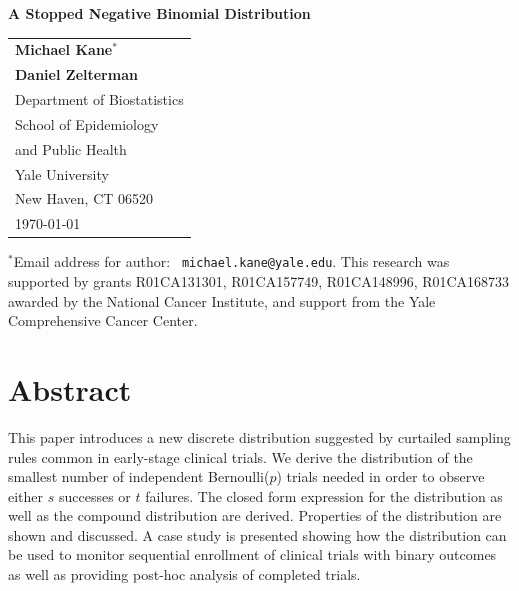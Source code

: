 \documentclass[12pt]{article}         %
\begin{document}
\thispagestyle{empty}
\begin{center}
\vspace*{\fill}

{\Large\bf A Stopped Negative Binomial Distribution} \\ [1ex]

\vspace*{1.25in}
\begin{tabular}{l} 
 {\bf Michael Kane${}^*$} \\
 {\bf Daniel Zelterman}  \\[.1in]

 Department of Biostatistics \\
 School of Epidemiology  \\
 \hspace*{.15in} and Public Health  \\
 Yale University       \\
 New Haven, CT  06520  \\[.2in]

\today
\end{tabular}
\end{center}

\vspace*{\fill}

\noindent${}^*$Email address for author: {\tt
michael.kane@yale.edu}.  This research was supported by grants 
	R01CA131301, R01CA157749, R01CA148996, R01CA168733 awarded by the National Cancer Institute, and support from the Yale Comprehensive Cancer Center.


\newpage
\thispagestyle{empty}

\section*    {\bf   Abstract}

This paper introduces a new discrete distribution suggested by curtailed sampling rules common in early-stage clinical trials. We derive the distribution of the smallest number of independent Bernoulli($p$) trials needed in order to observe either $s$ successes or $t$ failures. The closed form expression for the distribution as well as the compound distribution are derived. Properties of the distribution are shown and discussed. A case study is presented showing how the distribution can be used to monitor sequential enrollment of clinical trials with binary outcomes as well as providing post-hoc analysis of completed trials.
\end{document}
